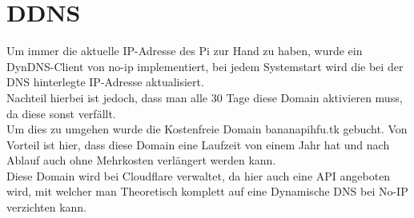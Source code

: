 \section{DDNS}
Um immer die aktuelle IP-Adresse des Pi zur Hand zu haben, wurde ein DynDNS-Client von no-ip implementiert, bei jedem Systemstart wird die bei der DNS hinterlegte IP-Adresse aktualisiert.\\
Nachteil hierbei ist jedoch, dass man alle 30 Tage diese Domain aktivieren muss, da diese sonst verfällt.\\
Um dies zu umgehen wurde die Kostenfreie Domain bananapihfu.tk gebucht. Von Vorteil ist hier, dass diese Domain eine Laufzeit von einem Jahr hat und nach Ablauf auch ohne Mehrkosten verlängert werden kann.\\
Diese Domain wird bei Cloudflare verwaltet, da hier auch eine API angeboten wird, mit welcher man Theoretisch komplett auf eine Dynamische DNS bei No-IP verzichten kann.

